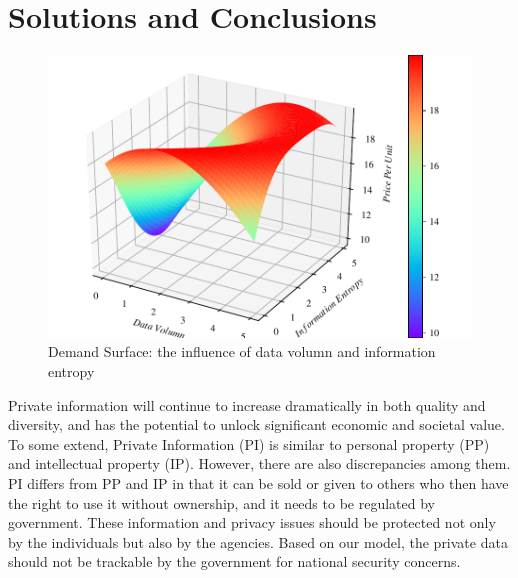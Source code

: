 \documentclass[a4paper,12pt]{texMemo} %
\begin{document}
\section{Solutions and Conclusions}
\begin{figure}
\begin{center}
\includegraphics[width=0.7\linewidth]{fig/demand_surface.pdf}
\caption{Demand Surface: the influence of data volumn and information entropy}
\end{center}
\end{figure}


Private information will continue to increase dramatically in both quality and diversity, and has the potential to unlock significant economic and societal value.
To some extend, Private Information (PI) is similar to personal property (PP) and intellectual property (IP). However, there are also discrepancies among them. PI differs from PP and IP in that it can be sold or given to others who then have the right to use it without ownership, and it needs to be regulated by government. These information and privacy issues should be protected not only by the individuals but also by the agencies. Based on our model, the private data should not be trackable by the government for national security concerns.

\end{document}
